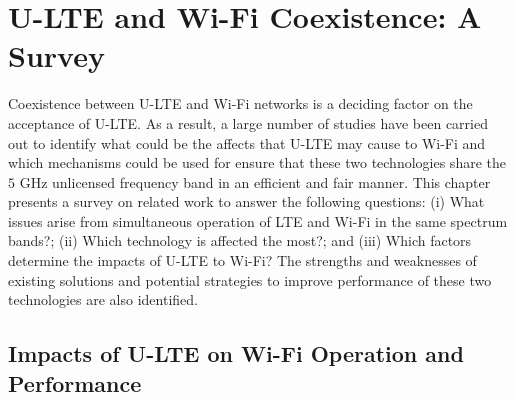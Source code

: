 %
%
%
\chapter{U-LTE and Wi-Fi Coexistence: A Survey}
\label{survey} %


Coexistence between U-LTE and Wi-Fi networks is a deciding factor on the acceptance of U-LTE. As a result, a large number of studies have been carried out to identify what could be the affects that U-LTE may cause to Wi-Fi and which mechanisms could be used for ensure that these two technologies share the $5$ GHz unlicensed frequency band in an efficient and fair manner. This chapter presents a survey on related work to answer the following questions: (i) What issues arise from simultaneous operation of LTE and Wi-Fi in the same spectrum bands?; (ii) Which technology is affected the most?; and (iii) Which factors determine the impacts of U-LTE to Wi-Fi? The strengths and weaknesses of existing solutions and potential strategies to improve performance of these two technologies are also identified.

\section{Impacts of U-LTE on Wi-Fi Operation and Performance}

